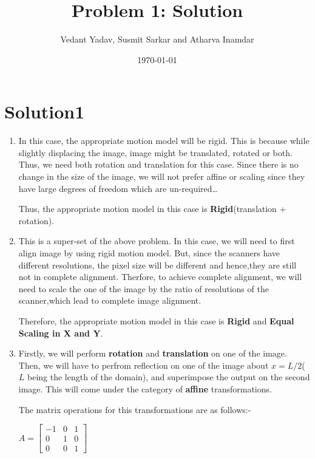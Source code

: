\documentclass[12pt]{article}
\title{Problem 1: Solution}
\author{Vedant Yadav, Susmit Sarkar and Atharva Inamdar}
\date{\today}
\begin{document}
\maketitle

\section*{Solution1}
\begin{enumerate}[label = (\alph*)]
  \item In this case, the appropriate motion model will be rigid. This is because while slightly displacing the image, image might be translated, rotated or both. Thus, we need both rotation and translation for this case. Since there is no change in the size of the image,
  we will not prefer affine or scaling since they have large degrees of freedom which are un-required\dots
  
  Thus, the appropriate motion model in this case is \textbf{Rigid}(translation + rotation).

  \item  This is a super-set of the above problem. In this case, we will need to first align image by using rigid motion model. But, since the scanners have different resolutions, the pixel size will be different and hence,they are still not in complete alignment. Therfore, to achieve complete alignment, we will need to scale the one of the image by the ratio of resolutions of the scanner,which lead to complete image alignment.
  
  Therefore, the appropriate motion model in this case is \textbf{Rigid} and \textbf{Equal Scaling in X and Y}.

  \item Firstly, we will perform \textbf{rotation} and \textbf{translation} on one of the image. Then, we will have to perfrom reflection on one of the image about $x = L / 2$($L$ being the length of the domain), and superimpose the output on the second image. This will come under the category of \textbf{affine} transformations.

  The matrix operations for this transformations are as follows:-
  
  \hspace{5cm}
   $A = \begin{bmatrix}
    -1 & 0 & 1\\
    0 & 1 & 0\\
    0 & 0 & 1 
    \end{bmatrix}$

\end{enumerate}
\end{document}
